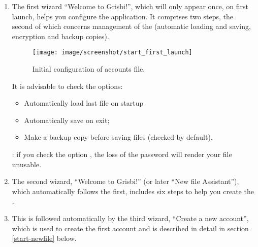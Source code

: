 \begin{enumerate}
	\item The first wizard \enquote{Welcome to Grisbi!}, which will only appear once, on first launch, helps you configure the application. It comprises two steps, the second of which concerns management of the  (automatic loading and saving, encryption and backup copies).

\begin{figure}[htbp]
	\begin{center}
		\texttt{[image: image/screenshot/start\_first\_launch]}
	\end{center}
	\caption{Initial configuration of accounts file.}
	\label{start_first_launch}
\end{figure}

It is advisable to check the options:

	\begin{itemize}
		\item Automatically load last file on startup%
		\item Automatically save on exit;%
		\item Make a backup copy before saving files (checked by default).%
	\end{itemize}

\textcolor{red}{}: if you check the option , the loss of the password will render your file unusable.%

	\item The second wizard, \enquote{Welcome to Grisbi!} (or later \enquote{New file Assistant}), which automatically follows the first, includes six steps to help you create the .%
	\item This is followed automatically by the third wizard, \enquote{Create a new account}, which is used to create the first account and is described in detail in section \ref{start-newfile} below.%
\end{enumerate}

